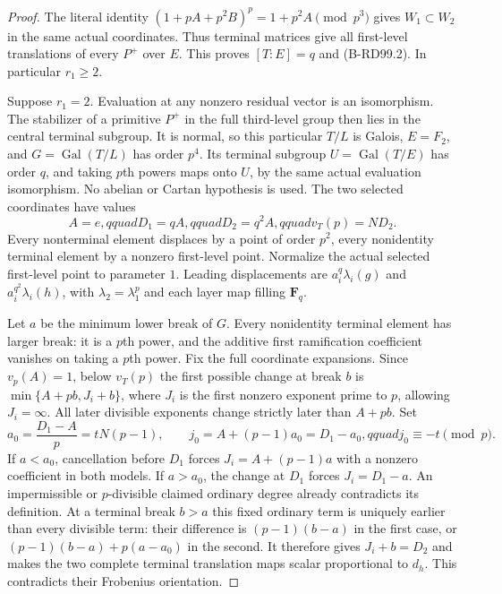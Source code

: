 \begin{proof}
The literal identity $(1+pA+p^2B)^p=1+p^2A\pmod{p^3}$
gives $W_1\subset W_2$ in the same actual coordinates.
Thus terminal matrices give all first-level translations of
every $P^+$ over $E$. This proves $[T:E]=q$ and (B-RD99.2).
In particular $r_1\ge2$.

Suppose $r_1=2$. Evaluation at any nonzero residual vector
is an isomorphism. The stabilizer of a primitive $P^+$ in
the full third-level group then lies in the central terminal
subgroup. It is normal, so this particular $T/L$ is Galois,
$E=F_2$, and $G=\operatorname{Gal}(T/L)$ has order $p^4$.
Its terminal subgroup $U=\operatorname{Gal}(T/E)$ has order
$q$, and taking $p$th powers maps onto $U$, by the same actual
evaluation isomorphism. No abelian or Cartan hypothesis is used.
The two selected coordinates have values
\[
 A=e,qquad D_1=qA,qquad D_2=q^2A,qquad v_T(p)=ND_2.
                                                        \tag{B-RD99.6}
\]
Every nonterminal element displaces by a point of order $p^2$,
every nonidentity terminal element by a nonzero first-level
point. Normalize the actual selected first-level point to
parameter $1$. Leading displacements are
$a_i^q\lambda_i(g)$ and $a_i^{q^2}\lambda_i(h)$, with
$\lambda_2=\lambda_1^p$ and each layer map filling $\mathbf F_q$.

Let $a$ be the minimum lower break of $G$. Every nonidentity
terminal element has larger break: it is a $p$th power, and
the additive first ramification coefficient vanishes on taking
a $p$th power. Fix the full coordinate expansions. Since
$v_p(A)=1$, below $v_T(p)$ the first possible change at break
$b$ is $\min\{A+pb,J_i+b\}$, where $J_i$ is the first
nonzero exponent prime to $p$, allowing $J_i=\infty$.
All later divisible exponents change strictly later than
$A+pb$. Set
\[
 a_0=\frac{D_1-A}{p}=tN(p-1),\qquad
 j_0=A+(p-1)a_0=D_1-a_0,qquad j_0\equiv-t\pmod p.
                                                        \tag{B-RD99.7}
\]
If $a<a_0$, cancellation before $D_1$ forces
$J_i=A+(p-1)a$ with a nonzero coefficient in both models.
If $a>a_0$, the change at $D_1$ forces $J_i=D_1-a$.
An impermissible or $p$-divisible claimed ordinary degree
already contradicts its definition. At a terminal break $b>a$
this fixed ordinary term is uniquely earlier than every
divisible term: their difference is $(p-1)(b-a)$ in the
first case, or $(p-1)(b-a)+p(a-a_0)$ in the second.
It therefore gives $J_i+b=D_2$ and makes the two complete
terminal translation maps scalar proportional to $d_h$.
This contradicts their Frobenius orientation.


\end{proof}
